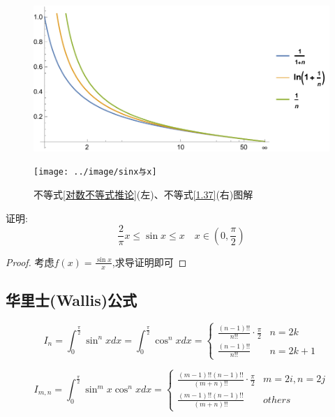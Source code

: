 \begin{figure}[htbp]
    \centering
    \subfloat
    {
        \begin{minipage}[t]{0.49\textwidth}
            \centering
            \includegraphics[width=\textwidth]{../image/对数不等式推论}
        \end{minipage}
    }
    \subfloat
    {
        \begin{minipage}[t]{0.49\textwidth}
            \centering
            \texttt{[image: ../image/sinx与x]}
        \end{minipage}
    }
    \vspace{6pt}
    \caption{不等式\ref{对数不等式推论}(左)、不等式\ref{1.37}(右)图解}
\end{figure}

\begin{example}
    证明:\begin{equation}
        \frac{2}{\pi}x \le \sin x \le x \quad x\in (0,\frac{\pi}{2}) \label{1.37}
    \end{equation}
\end{example}

\begin{proof}
    考虑$f(x)=\frac{\sin x}{x}$,求导证明即可
\end{proof}

\subsection{华里士(Wallis)公式}
\begin{theorem}[Wallis公式]
    \begin{equation}
        I_n=\int_{0}^{\frac{\pi}{2}} \sin^n xdx=\int_{0}^{\frac{\pi}{2}} \cos^n xdx=
        \begin{cases}
        \frac{(n-1)!!}{n!!} \cdot \frac{\pi}{2}& n=2k\\ 
        \frac{(n-1)!!}{n!!}& n=2k+1
        \end{cases}
    \end{equation}

    \begin{equation}
        I_{m,n}=\int_{0}^{\frac{\pi}{2}}\sin^m x \cos^n xdx=
    \begin{cases}
        \frac{(m-1)!!(n-1)!!}{(m+n)!!}\cdot \frac{\pi}{2} & m=2i,n=2j\\ 
        \frac{(m-1)!!(n-1)!!}{(m+n)!!}& others
    \end{cases}
    \end{equation}
\end{theorem}

